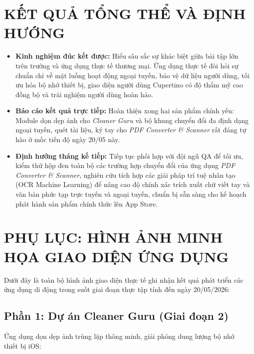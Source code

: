 \documentclass[12pt, a4paper]{article}
\begin{document}
\section{KẾT QUẢ TỔNG THỂ VÀ ĐỊNH HƯỚNG}
\begin{itemize}
    \item \textbf{Kinh nghiệm đúc kết được:} Hiểu sâu sắc sự khác biệt giữa bài tập lớn trên trường và ứng dụng thực tế thương mại. Ứng dụng thực tế đòi hỏi sự chuẩn chỉ về mặt luồng hoạt động ngoại tuyến, bảo vệ dữ liệu người dùng, tối ưu hóa bộ nhớ thiết bị, giao diện người dùng Cupertino có độ thẩm mỹ cao đồng bộ và trải nghiệm người dùng hoàn hảo.
    \item \textbf{Báo cáo kết quả trực tiếp:} Hoàn thiện xong hai sản phẩm chính yếu: Module dọn dẹp ảnh cho \textit{Cleaner Guru} và bộ khung chuyển đổi đa định dạng ngoại tuyến, quét tài liệu, ký tay cho \textit{PDF Converter \& Scanner} rất đáng tự hào ở mốc tiến độ ngày 20/05 này.
    \item \textbf{Định hướng tháng kế tiếp:} Tiếp tục phối hợp với đội ngũ QA để tối ưu, kiểm thử hộp đen toàn bộ các trường hợp chuyển đổi của ứng dụng \textit{PDF Converter \& Scanner}, nghiên cứu tích hợp các giải pháp trí tuệ nhân tạo (OCR Machine Learning) để nâng cao độ chính xác trích xuất chữ viết tay và văn bản phức tạp trực tuyến và ngoại tuyến, chuẩn bị sẵn sàng cho kế hoạch phát hành sản phẩm chính thức lên App Store.
\end{itemize}

\newpage
\section*{PHỤ LỤC: HÌNH ẢNH MINH HỌA GIAO DIỆN ỨNG DỤNG}
Dưới đây là toàn bộ hình ảnh giao diện thực tế ghi nhận kết quả phát triển các ứng dụng di động trong suốt giai đoạn thực tập tính đến ngày 20/05/2026:

\subsection*{Phần 1: Dự án Cleaner Guru (Giai đoạn 2)}
Ứng dụng dọn dẹp ảnh trùng lặp thông minh, giải phóng dung lượng bộ nhớ thiết bị iOS:
\end{document}
